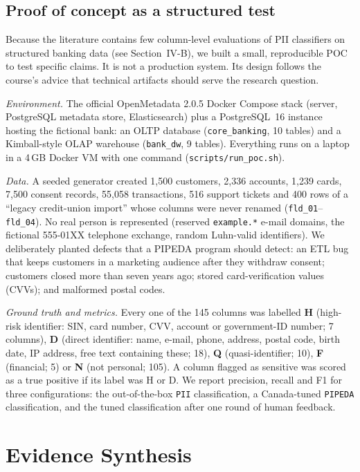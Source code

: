 \documentclass[journal,onecolumn,11pt]{IEEEtran}
\begin{document}
\subsection{Proof of concept as a structured test}
Because the literature contains few column-level evaluations of PII classifiers on structured banking data (see Section~IV-B), we built a small, reproducible POC to test specific claims. It is not a production system. Its design follows the course's advice that technical artifacts should serve the research question.

\emph{Environment.} The official OpenMetadata 2.0.5 Docker Compose stack (server, PostgreSQL metadata store, Elasticsearch) plus a PostgreSQL~16 instance hosting the fictional bank: an OLTP database (\texttt{core\_banking}, 10 tables) and a Kimball-style OLAP warehouse (\texttt{bank\_dw}, 9 tables). Everything runs on a laptop in a 4\,GB Docker VM with one command (\texttt{scripts/run\_poc.sh}).

\emph{Data.} A seeded generator created 1,500 customers, 2,336 accounts, 1,239 cards, 7,500 consent records, 55,058 transactions, 516 support tickets and 400 rows of a ``legacy credit-union import'' whose columns were never renamed (\texttt{fld\_01}--\texttt{fld\_04}). No real person is represented (reserved \texttt{example.*} e-mail domains, the fictional 555-01XX telephone exchange, random Luhn-valid identifiers). We deliberately planted defects that a PIPEDA program should detect: an ETL bug that keeps customers in a marketing audience after they withdraw consent; customers closed more than seven years ago; stored card-verification values (CVVs); and malformed postal codes.

\emph{Ground truth and metrics.} Every one of the 145 columns was labelled \textbf{H} (high-risk identifier: SIN, card number, CVV, account or government-ID number; 7 columns), \textbf{D} (direct identifier: name, e-mail, phone, address, postal code, birth date, IP address, free text containing these; 18), \textbf{Q} (quasi-identifier; 10), \textbf{F} (financial; 5) or \textbf{N} (not personal; 105). A column flagged as sensitive was scored as a true positive if its label was H or D. We report precision, recall and F1 for three configurations: the out-of-the-box \texttt{PII} classification, a Canada-tuned \texttt{PIPEDA} classification, and the tuned classification after one round of human feedback.

\section{Evidence Synthesis}
\end{document}

